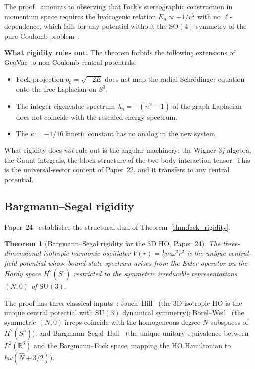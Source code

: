 \documentclass[twocolumn,pra,amsmath,amssymb,superscriptaddress]{revtex4-2}
\newtheorem{theorem}{Theorem}
\begin{document}
The proof~\cite{paper23} amounts to observing that Fock's
stereographic construction in momentum space requires the hydrogenic
relation $E_n \propto -1/n^2$ with no $\ell$-dependence, which fails
for any potential without the $\mathrm{SO}(4)$ symmetry of the pure
Coulomb problem~\cite{bander_itzykson1966}.

\medskip\noindent\textbf{What rigidity rules out.}  The theorem
forbids the following extensions of GeoVac to non-Coulomb central
potentials:
\begin{itemize}
\item Fock projection $p_0 = \sqrt{-2E}$ does not map the radial
  Schr\"odinger equation onto the free Laplacian on $S^3$.
\item The integer eigenvalue spectrum $\lambda_n = -(n^2 - 1)$ of
  the graph Laplacian does not coincide with the rescaled energy
  spectrum.
\item The $\kappa = -1/16$ kinetic constant has no analog in the
  new system.
\end{itemize}
What rigidity does \emph{not} rule out is the angular machinery: the
Wigner $3j$ algebra, the Gaunt integrals, the block structure of the
two-body interaction tensor.  This is the universal-sector content
of Paper~22, and it transfers to any central potential.

\subsection{Bargmann--Segal rigidity}
\label{sec:bs_rigidity}

Paper~24~\cite{paper24} establishes the structural dual of
Theorem~\ref{thm:fock_rigidity}.

\begin{theorem}[Bargmann--Segal rigidity for the 3D HO, Paper~24]
\label{thm:bs_rigidity}
The three-dimensional isotropic harmonic oscillator
$V(r) = \tfrac{1}{2} m\omega^2 r^2$ is the unique central-field
potential whose bound-state spectrum arises from the Euler operator
on the Hardy space $H^2(S^5)$ restricted to the symmetric
irreducible representations $(N, 0)$ of $\mathrm{SU}(3)$.
\end{theorem}

The proof has three classical inputs~\cite{paper24}:
Jauch--Hill~\cite{jauchhill1940} (the 3D isotropic HO is the unique
central potential with $\mathrm{SU}(3)$ dynamical symmetry);
Borel--Weil~\cite{borelweil} (the symmetric $(N, 0)$ irreps coincide
with the homogeneous degree-$N$ subspaces of $H^2(S^5)$); and
Bargmann--Segal--Hall~\cite{bargmann1961,hall1994} (the unique
unitary equivalence between $L^2(\mathbb{R}^3)$ and the
Bargmann--Fock space, mapping the HO Hamiltonian to
$\hbar\omega(\hat{N} + 3/2)$).
\end{document}
